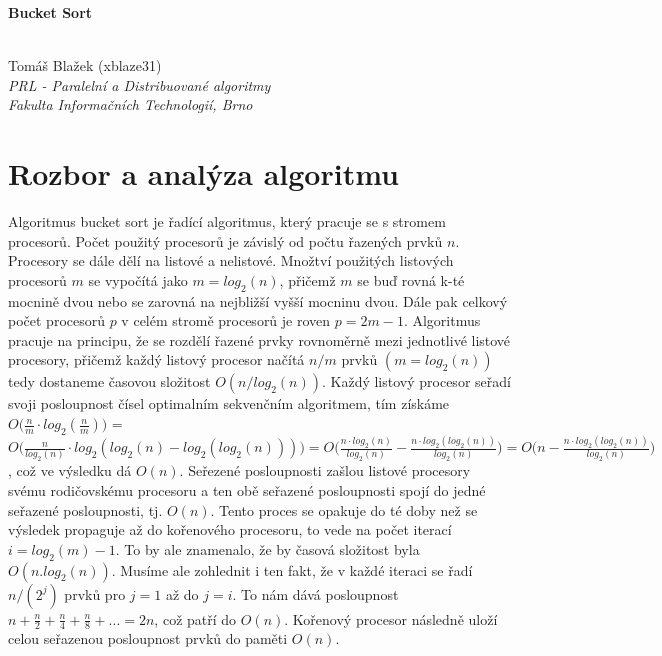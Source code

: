 \documentclass[12pt, a4paper]{article}
\begin{document}
\begin{center}
	\begin{huge}\textbf{Bucket Sort}\end{huge} \\
	\vspace{0.4cm}
	Tomáš Blažek (xblaze31) \\
	\textit{PRL - Paralelní a Distribuované algoritmy} \\
	\textit{Fakulta Informačních Technologií, Brno} \\
\end{center}



\section{Rozbor a analýza algoritmu}
\label{sec:rozbor}
Algoritmus bucket sort je řadící algoritmus, který pracuje se s stromem procesorů. Počet použitý procesorů je závislý od počtu řazených prvků $n$. Procesory se dále dělí na listové a nelistové. Množtví použitých listových procesorů $m$ se vypočítá jako $m=log_{2}(n)$, přičemž $m$ se buď rovná k-té mocnině dvou nebo se zarovná na nejbližší vyšší mocninu dvou. Dále pak celkový počet procesorů $p$ v celém stromě procesorů je roven $p = 2m-1$. Algoritmus pracuje na principu, že se rozdělí řazené prvky rovnoměrně mezi jednotlivé listové procesory, přičemž každý listový procesor načítá $n/m$ prvků $(m=log_{2}(n))$ tedy dostaneme časovou složitost $O(n/log_{2}(n))$. Každý listový procesor seřadí svoji posloupnost čísel optimalním sekvenčním algoritmem, tím získáme $O\big(\frac{n}{m}\cdot log_{2}(\frac{n}{m})\big)$ = $O\big(\frac{n}{log_{2}(n)}\cdot log_{2}(log_{2}(n)-log_{2}(log_{2}(n)))\big) = O\big(\frac{n\cdot log_{2}(n)}{log_{2}(n)}-\frac{n\cdot log_{2}(log_{2}(n))}{log_{2}(n)}\big) = O\big(n-\frac{n\cdot log_{2}(log_{2}(n))}{log_{2}(n)}\big)$, což ve výsledku dá $O(n)$. Seřezené posloupnosti zašlou listové procesory svému rodičovskému procesoru a ten obě seřazené posloupnosti spojí do jedné seřazené posloupnosti, tj. $O(n)$. Tento proces se opakuje do té doby než se výsledek propaguje až do kořenového procesoru, to vede na počet iterací  $i = log_{2}(m)-1$. To by ale znamenalo, že by časová složitost byla $O(n.log_{2}(n))$. Musíme ale zohlednit i ten fakt, že v každé iteraci se řadí $n/(2^j)$ prvků pro $j = 1$ až do $j = i$. To nám dává posloupnost $n + \frac{n}{2} + \frac{n}{4} +\frac{n}{8} + ... = 2n$, což patří do $O(n)$. Kořenový procesor následně uloží celou seřazenou posloupnost prvků do paměti $O(n)$. 
\end{document}
